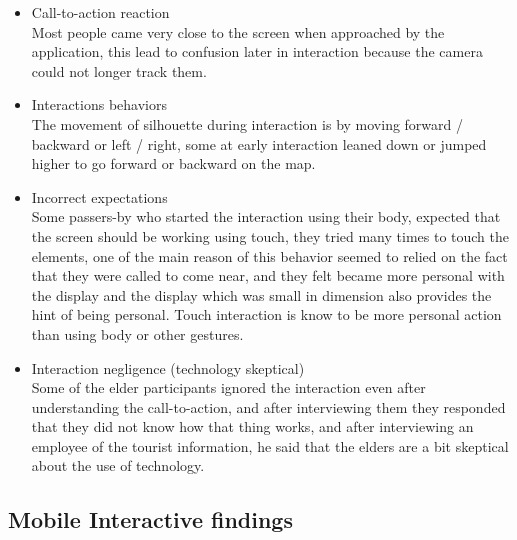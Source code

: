 \begin{enumerate}
\begin{itemize}
\item Call-to-action reaction \\
Most people came very close to the screen when approached by the application, this lead to confusion later in interaction because the camera could not longer track them.

\item Interactions behaviors \\
The movement of silhouette during interaction is by moving forward / backward or left / right, some at early interaction leaned down or jumped higher to go forward or backward on the map.


\item Incorrect expectations \\
Some passers-by who started the interaction using their body, expected that the screen should be working using touch, they tried many times to touch the elements, one of the main reason of this behavior seemed to relied on the fact that they were called to come near, and they felt became more personal with the display and the display which was small in dimension also provides the hint of being personal. Touch interaction is know to be more personal action than using body or other gestures. 


\item Interaction negligence (technology skeptical) \\
Some of the elder participants ignored the interaction even after understanding the call-to-action, and after interviewing them they responded that they did not know how that thing works, and after interviewing an employee of the tourist information, he said that the elders are a bit skeptical about the use of technology. 

\end{itemize}

\end{enumerate}


\newpage
\subsection{Mobile Interactive findings}

